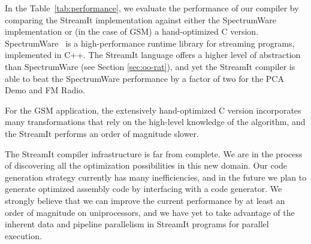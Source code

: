 In the Table~\ref{tab:performance}, we evaluate the performance of our
compiler by comparing the StreamIt implementation against either the
SpectrumWare implementation or (in the case of GSM) a hand-optimized C
version.  SpectrumWare \cite{spectrumware}~is a high-performance
runtime library for streaming programs, implemented in C++.  The
StreamIt language offers a higher level of abstraction than
SpectrumWare (see Section \ref{sec:oo-rat}), and yet the StreamIt
compiler is able to beat the SpectrumWare performance by a factor of
two for the PCA Demo and FM Radio.

For the GSM application, the extensively hand-optimized C version
incorporates many transformations that rely on the high-level
knowledge of the algorithm, and the StreamIt performs an order of
magnitude slower.

The StreamIt compiler infrastructure is far from complete.  We are in
the process of discovering all the optimization possibilities in this
new domain.  Our code generation strategy currently has many
inefficiencies, and in the future we plan to generate optimized
assembly code by interfacing with a code generator.  We strongly
believe that we can improve the current performance by at least an
order of magnitude on uniprocessors, and we have yet to take advantage
of the inherent data and pipeline parallelism in StreamIt programs for
parallel execution.
